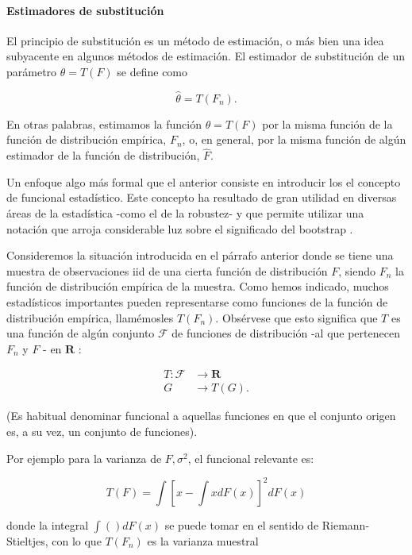 \documentclass[
]{article}
\begin{document}
\paragraph{Estimadores de substitución}\label{estimadores-de-substituciuxf3n}

El principio de substitución es un método de estimación, o más bien una idea subyacente en algunos métodos de estimación. El estimador de substitución de un parámetro \(\theta=T(F)\) se define como

\[
\hat{\theta}=T\left(F_{n}\right) .
\]

En otras palabras, estimamos la función \(\theta=T(F)\) por la misma función de la función de distribución empírica, \(F_{n}\), o, en general, por la misma función de algún estimador de la función de distribución, \(\hat{F}\).

Un enfoque algo más formal que el anterior consiste en introducir los el concepto de funcional estadístico. Este concepto ha resultado de gran utilidad en diversas áreas de la estadística -como el de la robustez- y que permite
utilizar una notación que arroja considerable luz sobre el significado del bootstrap .

Consideremos la situación introducida en el párrafo anterior donde se tiene una muestra de observaciones iid de una cierta función de distribución \(F\), siendo \(F_{n}\) la función de distribución empírica de la muestra. Como hemos indicado, muchos estadísticos importantes pueden representarse como funciones de la función de distribución empírica, llamémosles \(T\left(F_{n}\right)\). Obsérvese que esto significa que \(T\) es una función de algún conjunto \(\mathcal{F}\) de funciones de distribución -al que pertenecen \(F_{n}\) y \(F\) - en \(\mathbf{R}\) :

\[
\begin{aligned}
T: \mathcal{F} & \longrightarrow \mathbf{R} \\
G & \longrightarrow T(G) .
\end{aligned}
\]

(Es habitual denominar funcional a aquellas funciones en que el conjunto origen es, a su vez, un conjunto de funciones).

Por ejemplo para la varianza de \(F, \sigma^{2}\), el funcional relevante es:

\[
T(F)=\int\left[x-\int x d F(x)\right]^{2} d F(x)
\]

donde la integral \(\int() d F(x)\) se puede tomar en el sentido de Riemann-Stieltjes, con lo que \(T\left(F_{n}\right)\) es la varianza muestral
\end{document}
